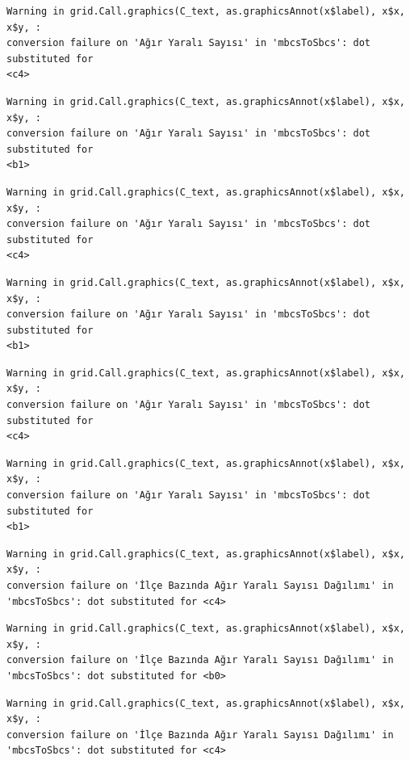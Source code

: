 \documentclass[
  11pt,
  a4paper,
  DIV=11,
  numbers=noendperiod]{scrartcl}
\begin{document}
\begin{verbatim}
Warning in grid.Call.graphics(C_text, as.graphicsAnnot(x$label), x$x, x$y, :
conversion failure on 'Ağır Yaralı Sayısı' in 'mbcsToSbcs': dot substituted for
<c4>
\end{verbatim}

\begin{verbatim}
Warning in grid.Call.graphics(C_text, as.graphicsAnnot(x$label), x$x, x$y, :
conversion failure on 'Ağır Yaralı Sayısı' in 'mbcsToSbcs': dot substituted for
<b1>
\end{verbatim}

\begin{verbatim}
Warning in grid.Call.graphics(C_text, as.graphicsAnnot(x$label), x$x, x$y, :
conversion failure on 'Ağır Yaralı Sayısı' in 'mbcsToSbcs': dot substituted for
<c4>
\end{verbatim}

\begin{verbatim}
Warning in grid.Call.graphics(C_text, as.graphicsAnnot(x$label), x$x, x$y, :
conversion failure on 'Ağır Yaralı Sayısı' in 'mbcsToSbcs': dot substituted for
<b1>
\end{verbatim}

\begin{verbatim}
Warning in grid.Call.graphics(C_text, as.graphicsAnnot(x$label), x$x, x$y, :
conversion failure on 'Ağır Yaralı Sayısı' in 'mbcsToSbcs': dot substituted for
<c4>
\end{verbatim}

\begin{verbatim}
Warning in grid.Call.graphics(C_text, as.graphicsAnnot(x$label), x$x, x$y, :
conversion failure on 'Ağır Yaralı Sayısı' in 'mbcsToSbcs': dot substituted for
<b1>
\end{verbatim}

\begin{verbatim}
Warning in grid.Call.graphics(C_text, as.graphicsAnnot(x$label), x$x, x$y, :
conversion failure on 'İlçe Bazında Ağır Yaralı Sayısı Dağılımı' in
'mbcsToSbcs': dot substituted for <c4>
\end{verbatim}

\begin{verbatim}
Warning in grid.Call.graphics(C_text, as.graphicsAnnot(x$label), x$x, x$y, :
conversion failure on 'İlçe Bazında Ağır Yaralı Sayısı Dağılımı' in
'mbcsToSbcs': dot substituted for <b0>
\end{verbatim}

\begin{verbatim}
Warning in grid.Call.graphics(C_text, as.graphicsAnnot(x$label), x$x, x$y, :
conversion failure on 'İlçe Bazında Ağır Yaralı Sayısı Dağılımı' in
'mbcsToSbcs': dot substituted for <c4>
\end{verbatim}
\end{document}
